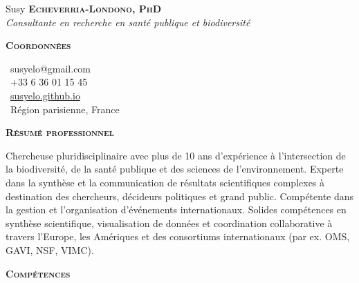 \documentclass[10pt, a4paper]{article}
\newcommand{\headleft}[1]{\vspace*{3ex}\textsc{\textbf{#1}}\par%
    \vspace*{-1.5ex}\hrulefill\par\vspace*{0.7ex}}
\begin{document}
\setlength{\topskip}{0pt}
\setlength{\parindent}{0pt}
\setlength{\parskip}{0pt}
\setlength{\fboxsep}{0pt}
\pagestyle{empty}
\raggedbottom

\begin{minipage}[t]{0.33\textwidth} %
\colorbox{cvblue}{\begin{minipage}[t][5mm][t]{\textwidth}\null\hfill\null\end{minipage}}

\vspace{-.2ex} %
\colorbox{cvblue!90}{\color{white}  %
\textwidth\relax%
\begin{minipage}[t][293mm][t]{0.82\textwidth}
\raggedright
\vspace*{2.5ex}

\Large Susy \textbf{\textsc{Echeverria-Londono, PhD}} \normalsize \\
\emph{Consultante en recherche en santé publique et biodiversité }


\headleft{Coordonnées}
\small %
\MVAt\ {\small susyelo@gmail.com} \\[0.4ex]
\Mobilefone\ +33 6 36 01 15 45 \\[0.5ex]
\Mundus\ \href{https://susyelo.github.io/}{susyelo.github.io} \\[0.1ex]
\Letter\ Région parisienne, France
\normalsize

\headleft{Résumé professionnel}
\small Chercheuse pluridisciplinaire avec plus de 10 ans d’expérience à l’intersection de la biodiversité, de la santé publique et des sciences de l’environnement. Experte dans la synthèse et la communication de résultats scientifiques complexes à destination des chercheurs, décideurs politiques et grand public. Compétente dans la gestion et l’organisation d’événements internationaux. Solides compétences en synthèse scientifique, visualisation de données et coordination collaborative à travers l’Europe, les Amériques et des consortiums internationaux (par ex. OMS, GAVI, NSF, VIMC).


\headleft{Compétences}
\normalsize

\begin{itemize}


\end{itemize}
\end{minipage}}
\end{minipage}
\end{document}
